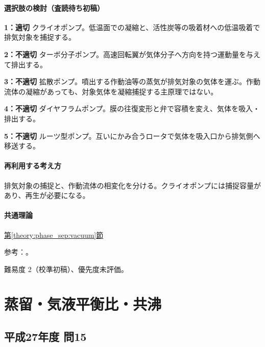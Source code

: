 \paragraph{選択肢の検討（査読待ち初稿）}\mbox{}\par

\noindent\textbf{1：適切} クライオポンプ。低温面での凝縮と、活性炭等の吸着材への低温吸着で排気対象を捕捉する。\par

\noindent\textbf{2：不適切} ターボ分子ポンプ。高速回転翼が気体分子へ方向を持つ運動量を与えて排出する。\par

\noindent\textbf{3：不適切} 拡散ポンプ。噴出する作動油等の蒸気が排気対象の気体を運ぶ。作動流体の凝縮があっても、対象気体を凝縮捕捉する主原理ではない。\par

\noindent\textbf{4：不適切} ダイヤフラムポンプ。膜の往復変形と弁で容積を変え、気体を吸入・排出する。\par

\noindent\textbf{5：不適切} ルーツ型ポンプ。互いにかみ合うロータで気体を吸入口から排気側へ移送する。\par

\paragraph{再利用する考え方} 排気対象の捕捉と、作動流体の相変化を分ける。クライオポンプには捕捉容量があり、再生が必要になる。

\paragraph{共通理論} \hyperref[theory:phase_sep:vacuum]{第\ref*{theory:phase_sep:vacuum}節}

\par 参考：\cite{leybold_cryopump}。

\par 難易度 2（校準初稿）、優先度未評価。

\section{蒸留・気液平衡比・共沸}

\subsection{平成27年度 問15}
\label{q:h27-reg-applied-15}

